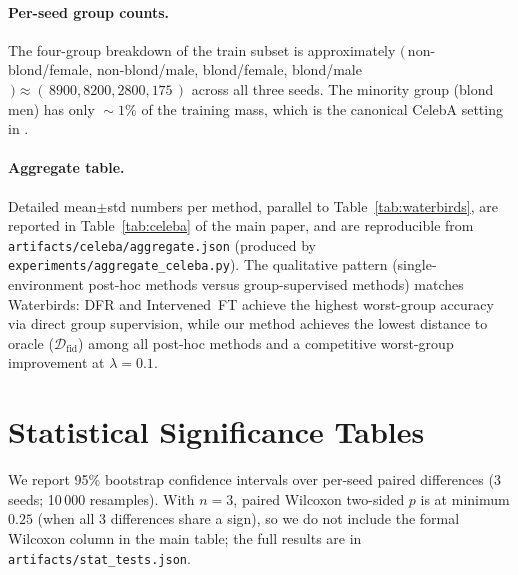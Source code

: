 \documentclass{article}
\newcommand{\Dfid}{\mathcal{D}_{\mathrm{fid}}}
\begin{document}
\paragraph{Per-seed group counts.}
The four-group breakdown of the train subset is approximately
$(\,$non-blond/female, non-blond/male, blond/female, blond/male$\,) \approx
(\,8900, 8200, 2800, 175\,)$ across all three seeds.  The minority group
(blond men) has only $\!\sim\!\!1\%$ of the training mass, which is the
canonical CelebA setting in \cite{sagawa2020dro}.

\paragraph{Aggregate table.}
Detailed mean$\pm$std numbers per method, parallel to Table~\ref{tab:waterbirds},
are reported in Table~\ref{tab:celeba} of the main paper, and are
reproducible from \texttt{artifacts/celeba/aggregate.json} (produced by
\texttt{experiments/aggregate\_celeba.py}).  The qualitative pattern
(single-environment post-hoc methods versus group-supervised methods)
matches Waterbirds: DFR and Intervened~FT achieve the highest worst-group
accuracy via direct group supervision, while our method achieves the lowest
distance to oracle ($\Dfid$) among all post-hoc methods and a competitive
worst-group improvement at $\lambda{=}0.1$.

\section{Statistical Significance Tables}
\label{app:stats}

We report 95\% bootstrap confidence intervals over per-seed paired
differences (3 seeds; 10\,000 resamples).  With $n{=}3$, paired Wilcoxon
two-sided $p$ is at minimum $0.25$ (when all 3 differences share a sign),
so we do not include the formal Wilcoxon column in the main table; the full
results are in \texttt{artifacts/stat\_tests.json}.
\end{document}
